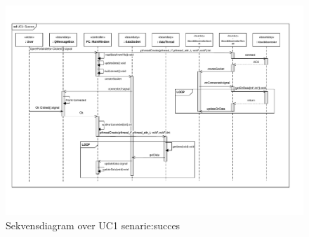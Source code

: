 \begin{figure}[H]
\centering
\includegraphics[width=\textwidth* 1,height=\textwidth* 7/10 ]{../fig/diagrammer/pc/sd_uc1_succes.pdf}
\caption{Sekvensdiagram over UC1 senarie:succes}
\label{fig:cd_uc1_succes_gui}
\end{figure}

